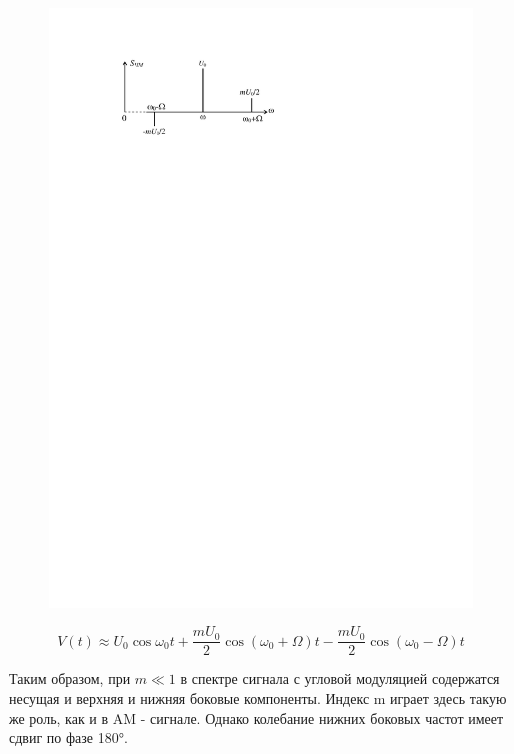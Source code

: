 \documentclass[a4paper,12pt]{article}
\begin{document}
\begin{figure}[h!]
	\centering
	\includegraphics[]{fig/fig2-4}
	\caption{}
	\label{fig:2.4}
\end{figure}

\begin{equation}
	V(t) \approx U_{0} \cos \omega_{0} t+\frac{m U_{0}}{2} \cos \left(\omega_{0}+\Omega\right) t-\frac{m U_{0}}{2} \cos \left(\omega_{0}-\Omega\right) t
\end{equation}


Таким образом, при $m\ll 1$ в спектре сигнала с угловой модуляцией содержатся несущая и верхняя и нижняя боковые компоненты. Индекс m играет здесь такую же роль, как и в AM - сигнале.
Однако колебание нижних боковых частот имеет сдвиг по фазе 180°.
\end{document}
